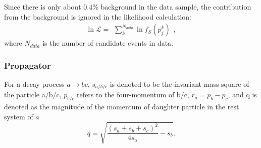 {    Since there is only about $0.4\%$ background in the data sample, the contribution from the background is ignored in the likelihood calculation:
    \begin{equation}
    \ln{\mathcal{L}} = \begin{matrix}\sum_{k}^{N_{data}} \ln f_{S}(p_{j}^{k})\end{matrix},  \label{likelihood}
    \end{equation}
    where $N_{data}$ is the number of candidate events in data.


    \subsubsection{Propagator}
    \label{propagator}
    \par{
        For a decay process $a \rightarrow bc$, $s_{a/b/c}$ is denoted to be the invariant mass square of the particle a/b/c, $p_{b/c}$ refers to the four-momentum of b/c, $r_{a}=p_{b}-p_{c}$, and q is denoted as the magnitude of the momentum of daughter particle in the rest system of $a$
        \begin{equation}
            q=\sqrt{ \frac{(s_{a} + s_{b} + s_{c})^{2}}{4s_{a}} - s_{b}}. \label{base-q}
        \end{equation}

}}
